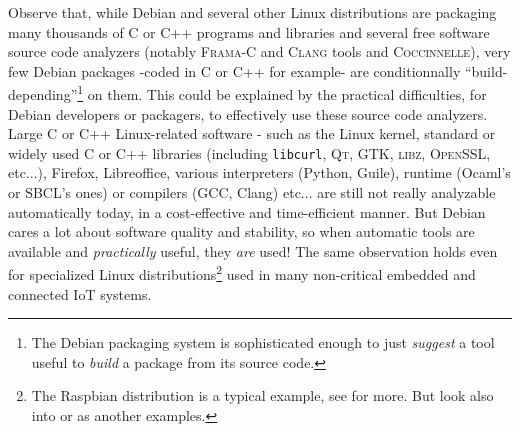 Observe that, while Debian and several other Linux distributions are
packaging many thousands of C or C++ programs and libraries and
several free software source code analyzers (notably \textsc{Frama-C}
and \textsc{Clang} tools and \textsc{Coccinnelle}), very few Debian
packages -coded in C or C++ for example- are conditionnally
``build-depending''\footnote{The Debian packaging system is
  sophisticated enough to just \emph{suggest} a tool useful to
  \emph{build} a package from its source code.} on them. This could be
explained by the practical difficulties, for Debian developers or
packagers, to effectively use these source code analyzers. Large C or
C++ Linux-related software - such as the Linux kernel, standard or
widely used C or C++ libraries (including \texttt{libcurl},
\textsc{Qt}, \textsc{GTK}, \textsc{libz}, \textsc{OpenSSL}, etc...),
Firefox, Libreoffice, various interpreters (Python, Guile), runtime
(Ocaml's or SBCL's ones) or compilers (GCC, Clang) etc... are still
not really analyzable automatically today, in a cost-effective and
time-efficient manner. But Debian cares a lot about software quality
and stability, so when automatic tools are available and
\emph{practically} useful, they \emph{are} used! The same observation
holds even for specialized Linux distributions\footnote{The Raspbian
  distribution is a typical example, see 
  for more. But look also into
   or
   as another examples.} used in many
non-critical embedded and connected IoT systems.


